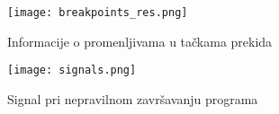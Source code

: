 \documentclass[a4paper]{article}
\begin{document}
\begin{figure}[h!]
\begin{center}
\texttt{[image: breakpoints\_res.png]}
\end{center}
\caption{Informacije o promenljivama u tačkama prekida}
\label{fig:points_res}
\end{figure}


\begin{figure}[h!]
\begin{center}
\texttt{[image: signals.png]}
\end{center}
\caption{Signal pri nepravilnom završavanju programa}
\label{fig:signals}
\end{figure}
\end{document}
